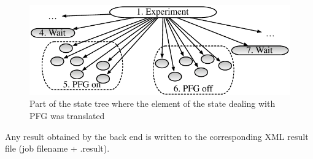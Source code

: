 \documentclass[12pt, a4paper, BCOR10mm, twoside, titlepage, headinclude]{scrbook}
\begin{document}
\begin{figure}
\centering
\includegraphics[]{traversing_machine}
\caption{Part of the state tree where the element of the state dealing with PFG was translated}
\label{traversemachine}
\end{figure}
Any result obtained by the back end is written to the corresponding \textsf{XML} result file (job filename + .result).
%
\end{document}

